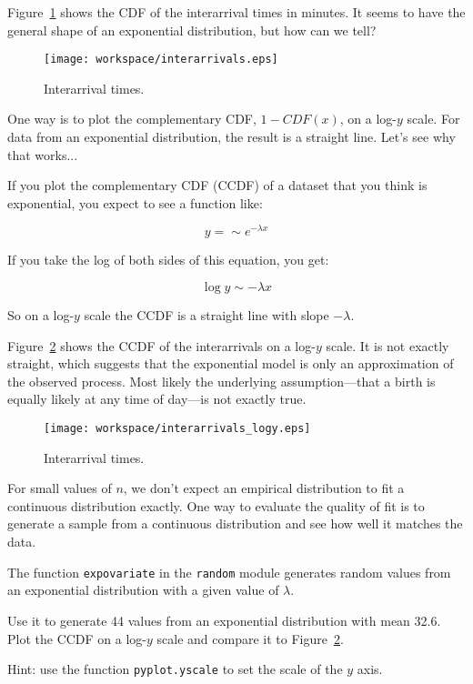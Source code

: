 \documentclass[10pt]{book}
\begin{document}
Figure~\ref{interarrivals} shows the CDF of the interarrival times
in minutes.  It seems to have the general shape of an exponential
distribution, but how can we tell?

\begin{figure}
\centerline{\texttt{[image: workspace/interarrivals.eps]}}
\caption{Interarrival times.}
\label{interarrivals}
\end{figure}

One way is to plot the complementary CDF, $1 - CDF(x)$, on a
log-$y$ scale.  For data from an exponential distribution, the result
is a straight line.  Let's see why that works...

If you plot the complementary CDF (CCDF) of a dataset that you think is
exponential, you expect to see a function like:

\[ y = \sim e^{-\lambda x} \]

If you take the log of both sides of this equation, you get:

\[ \log y \sim -\lambda x \]

So on a log-$y$ scale the CCDF is a straight line
with slope $-\lambda$.

Figure~\ref{interarrivals_logy}
shows the CCDF of the interarrivals on a
log-$y$ scale.  It is not exactly straight, which suggests that
the exponential model is only an approximation of the observed
process.  Most likely the underlying assumption---that a birth is
equally likely at any time of day---is not exactly true.

\begin{figure}
\centerline{\texttt{[image: workspace/interarrivals\_logy.eps]}}
\caption{Interarrival times.}
\label{interarrivals_logy}
\end{figure}

\begin{ex}
For small values of $n$, we don't expect an empirical distribution
to fit a continuous distribution exactly.  One way to evaluate
the quality of fit is to generate a sample from a continuous
distribution and see how well it matches the data.

The function {\tt expovariate} in the {\tt random} module
generates random values from an exponential distribution with
a given value of $\lambda$.

Use it to generate 44 values from an exponential distribution with
mean 32.6.  Plot the CCDF on a log-$y$ scale and compare
it to Figure~\ref{interarrivals_logy}.

Hint: use the function {\tt pyplot.yscale} to set the scale of the
$y$ axis.
\end{ex}
\end{document}
